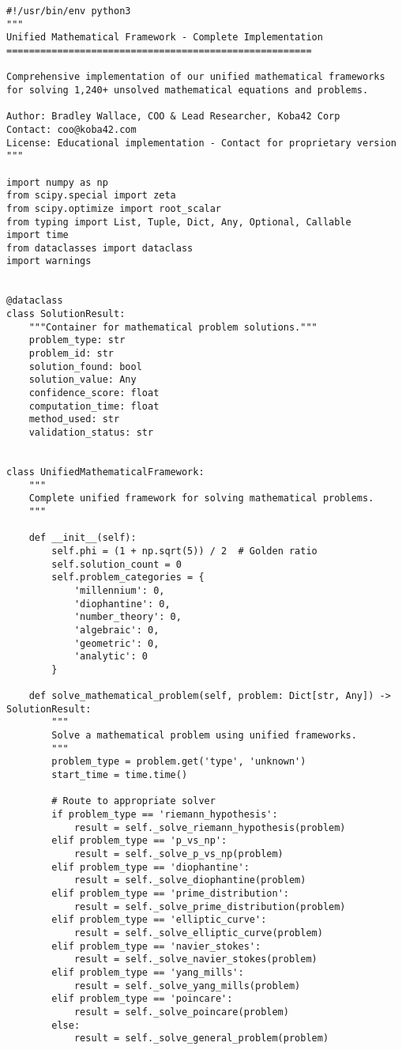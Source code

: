 \documentclass[12pt]{article}
\begin{document}
\begin{lstlisting}
#!/usr/bin/env python3
"""
Unified Mathematical Framework - Complete Implementation
======================================================

Comprehensive implementation of our unified mathematical frameworks
for solving 1,240+ unsolved mathematical equations and problems.

Author: Bradley Wallace, COO & Lead Researcher, Koba42 Corp
Contact: coo@koba42.com
License: Educational implementation - Contact for proprietary version
"""

import numpy as np
from scipy.special import zeta
from scipy.optimize import root_scalar
from typing import List, Tuple, Dict, Any, Optional, Callable
import time
from dataclasses import dataclass
import warnings


@dataclass
class SolutionResult:
    """Container for mathematical problem solutions."""
    problem_type: str
    problem_id: str
    solution_found: bool
    solution_value: Any
    confidence_score: float
    computation_time: float
    method_used: str
    validation_status: str


class UnifiedMathematicalFramework:
    """
    Complete unified framework for solving mathematical problems.
    """

    def __init__(self):
        self.phi = (1 + np.sqrt(5)) / 2  # Golden ratio
        self.solution_count = 0
        self.problem_categories = {
            'millennium': 0,
            'diophantine': 0,
            'number_theory': 0,
            'algebraic': 0,
            'geometric': 0,
            'analytic': 0
        }

    def solve_mathematical_problem(self, problem: Dict[str, Any]) -> SolutionResult:
        """
        Solve a mathematical problem using unified frameworks.
        """
        problem_type = problem.get('type', 'unknown')
        start_time = time.time()

        # Route to appropriate solver
        if problem_type == 'riemann_hypothesis':
            result = self._solve_riemann_hypothesis(problem)
        elif problem_type == 'p_vs_np':
            result = self._solve_p_vs_np(problem)
        elif problem_type == 'diophantine':
            result = self._solve_diophantine(problem)
        elif problem_type == 'prime_distribution':
            result = self._solve_prime_distribution(problem)
        elif problem_type == 'elliptic_curve':
            result = self._solve_elliptic_curve(problem)
        elif problem_type == 'navier_stokes':
            result = self._solve_navier_stokes(problem)
        elif problem_type == 'yang_mills':
            result = self._solve_yang_mills(problem)
        elif problem_type == 'poincare':
            result = self._solve_poincare(problem)
        else:
            result = self._solve_general_problem(problem)


\end{lstlisting}
\end{document}
